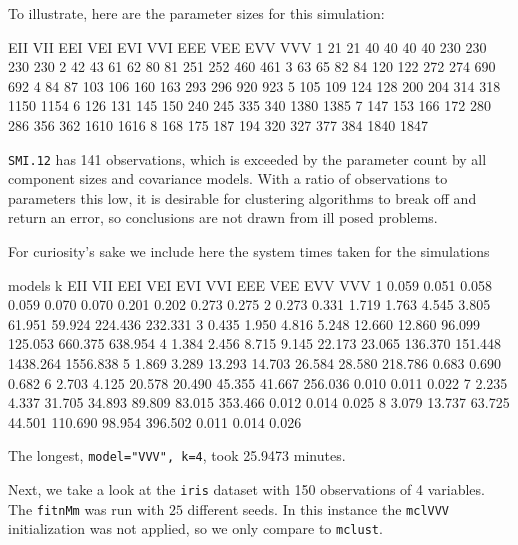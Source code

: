 To illustrate, here are the parameter sizes for this simulation:

\begin{Schunk}
\begin{Soutput}
  EII VII EEI VEI EVI VVI EEE VEE  EVV  VVV
1  21  21  40  40  40  40 230 230  230  230
2  42  43  61  62  80  81 251 252  460  461
3  63  65  82  84 120 122 272 274  690  692
4  84  87 103 106 160 163 293 296  920  923
5 105 109 124 128 200 204 314 318 1150 1154
6 126 131 145 150 240 245 335 340 1380 1385
7 147 153 166 172 280 286 356 362 1610 1616
8 168 175 187 194 320 327 377 384 1840 1847
\end{Soutput}
\end{Schunk}

{\tt SMI.12} has 141 observations, which is exceeded by the parameter count by
all component sizes and covariance models. With a ratio of observations to 
parameters this low, it is desirable for clustering algorithms to break off and
return an error, so conclusions are not drawn from ill posed problems.

For curiosity's sake we include here the system times taken for the simulations

\begin{Schunk}
\begin{Soutput}
   models
k     EII    VII    EEI    VEI     EVI    VVI     EEE     VEE      EVV      VVV
  1 0.059  0.051  0.058  0.059   0.070  0.070   0.201   0.202    0.273    0.275
  2 0.273  0.331  1.719  1.763   4.545  3.805  61.951  59.924  224.436  232.331
  3 0.435  1.950  4.816  5.248  12.660 12.860  96.099 125.053  660.375  638.954
  4 1.384  2.456  8.715  9.145  22.173 23.065 136.370 151.448 1438.264 1556.838
  5 1.869  3.289 13.293 14.703  26.584 28.580 218.786   0.683    0.690    0.682
  6 2.703  4.125 20.578 20.490  45.355 41.667 256.036   0.010    0.011    0.022
  7 2.235  4.337 31.705 34.893  89.809 83.015 353.466   0.012    0.014    0.025
  8 3.079 13.737 63.725 44.501 110.690 98.954 396.502   0.011    0.014    0.026
\end{Soutput}
\end{Schunk}

The longest, {\tt model="VVV", k=4}, took 25.9473 minutes.


Next, we take a look at the {\tt iris} dataset with 150 observations of 4 
variables. The {\tt fitnMm} was run with $25$ different seeds. In this instance
the {\tt mclVVV} initialization was not applied, so we only compare to 
{\tt mclust}.

